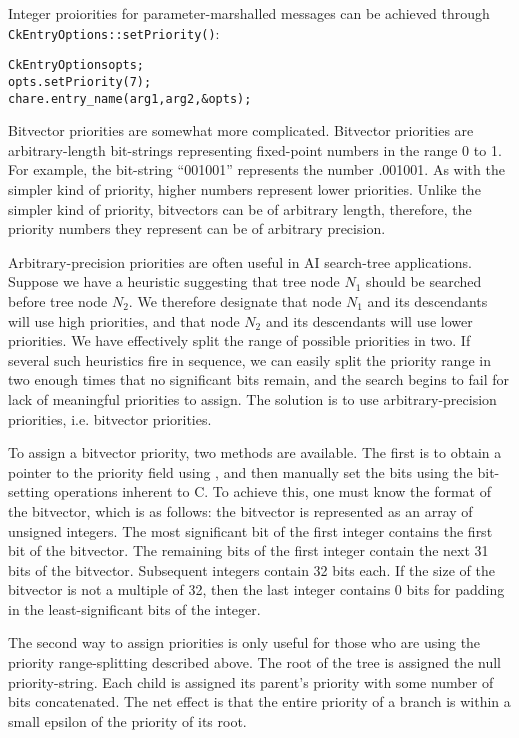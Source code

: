 Integer proiorities for parameter-marshalled messages can be achieved
through {\tt CkEntryOptions::setPriority()}:

\begin{alltt}
  CkEntryOptions opts;
  opts.setPriority(7);
  chare.entry_name(arg1, arg2, &opts);
\end{alltt}

Bitvector priorities are somewhat more complicated.  Bitvector
priorities are arbitrary-length bit-strings representing fixed-point
numbers in the range 0 to 1.  For example, the bit-string ``001001''
represents the number .001001\raisebox{-.5ex}{\scriptsize binary}.  As
with the simpler kind of priority, higher numbers represent lower
priorities.  Unlike the simpler kind of priority, bitvectors can be of
arbitrary length, therefore, the priority numbers they represent can
be of arbitrary precision.

Arbitrary-precision priorities
are often useful in AI search-tree applications.  Suppose we have a
heuristic suggesting that tree node $N_1$ should be searched before
tree node $N_2$.  We therefore designate that node $N_1$ and its
descendants will use high priorities, and that node $N_2$ and its
descendants will use lower priorities.  We have effectively split the
range of possible priorities in two.  If several such heuristics fire
in sequence, we can easily split the priority range  in two enough times that no significant bits remain,
and the search begins to fail for lack of meaningful priorities to
assign.  The solution is to use arbitrary-precision priorities,
i.e. bitvector priorities.

To assign a bitvector priority, two methods are available.  The
first is to obtain a pointer to the priority field using  ,
and then manually set the bits using the bit-setting operations
inherent to C.  To achieve this, one must know the format
 of the
bitvector, which is as follows: the bitvector is represented as an
array of unsigned integers.  The most significant bit of the first
integer contains the first bit of the bitvector.  The remaining bits
of the first integer contain the next 31 bits of the bitvector.
Subsequent integers contain 32 bits each.  If the size of the
bitvector is not a multiple of 32, then the last integer contains 0
bits for padding in the least-significant bits of the integer.

The second way to assign priorities is only useful for those who are
using the priority range-splitting
described above.  The root of the tree is assigned the null
priority-string.  Each child is assigned its parent's priority with
some number of bits concatenated.  The net effect is that the entire
priority of a branch is within a small epsilon of the priority of its
root.

